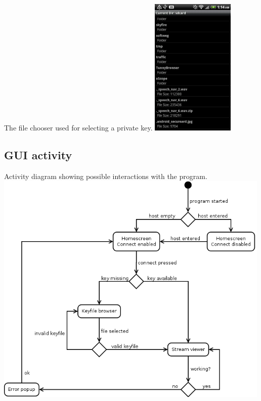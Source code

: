 \documentclass[a4paper,10pt]{scrartcl}
\begin{document}
\begin{illustration}{The file chooser used for selecting a private key.}
\includegraphics[width=150px]{figures/images/fileChooser.png}
\end{illustration}

\subsection{GUI activity}
\begin{illustration}{Activity diagram showing possible interactions with the program.}
\includegraphics [width=500px]{figures/gui_activity_1/gui_activity_1.png}
\end{illustration}
\end{document}
